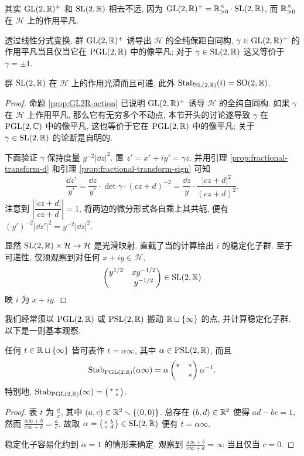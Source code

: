 其实 $\operatorname{GL}(2,\mathbb{R})^+$ 和 $\operatorname{SL}(2,\mathbb{R})$ 相去不远, 因为 $\operatorname{GL}(2,\mathbb{R})^+ = \mathbb{R}_{>0}^\times \cdot \operatorname{SL}(2,\mathbb{R})$, 而 $\mathbb{R}_{>0}^\times$ 在 $\mathcal{H}$ 上的作用平凡.

\begin{proposition}\label{prop:SL2-isometry}
	透过线性分式变换, 群 $\operatorname{GL}(2,\mathbb{R})^+$ 诱导出 $\mathcal{H}$ 的全纯保距自同构, $\gamma \in \operatorname{GL}(2,\mathbb{R})^+$ 的作用平凡当且仅当它在 $\operatorname{PGL}(2,\mathbb{R})$ 中的像平凡; 对于 $\gamma \in \operatorname{SL}(2,\mathbb{R})$ 这又等价于 $\gamma = \pm 1$.
	
	群 $\operatorname{SL}(2,\mathbb{R})$ 在 $\mathcal{H}$ 上的作用光滑而且可递, 此外 $\operatorname{Stab}_{\operatorname{SL}(2,\mathbb{R})}(i) = \operatorname{SO}(2,\mathbb{R})$.
\end{proposition}
\begin{proof}
	命题 \ref{prop:GL2R-action} 已说明 $\operatorname{GL}(2,\mathbb{R})^+$ 诱导 $\mathcal{H}$ 的全纯自同构. 如果 $\gamma$ 在 $\mathcal{H}$ 上作用平凡, 那么它有无穷多个不动点, 本节开头的讨论遂导致 $\gamma$ 在 $\operatorname{PGL}(2,\mathbb{C})$ 中的像平凡, 这也等价于它在 $\operatorname{PGL}(2,\mathbb{R})$ 中的像平凡; 关于 $\gamma \in \operatorname{SL}(2,\mathbb{R})$ 的论断是自明的.

	下面验证 $\gamma$ 保持度量 $y^{-2} |\dd z|^2$. 置 $z' = x'+iy' = \gamma z$. 并用引理 \ref{prop:fractional-transform-d} 和引理 \ref{prop:fractional-transform-sign} 可知
	\[ \frac{\dd z'}{y'} = \frac{\dd z}{y'} \cdot \det\gamma \cdot (cz+d)^{-2} = \frac{\dd z}{y} \cdot \frac{|cz+d|^2}{(cz+d)^2}. \]
	注意到 $\left|\dfrac{|cz+d|}{cz+d}\right|=1$, 将两边的微分形式各自乘上其共轭, 便有 $(y')^{-2}|\dd z'|^2 = y^{-2} |\dd z|^2$.
	
	显然 $\operatorname{SL}(2,\mathbb{R}) \times \mathcal{H} \to \mathcal{H}$ 是光滑映射. 直截了当的计算给出 $i$ 的稳定化子群. 至于可递性, 仅须观察到对任何 $x + iy \in \mathcal{H}$,
	\[ \begin{pmatrix} y^{1/2} & xy^{-1/2} \\ & y^{-1/2} \end{pmatrix} \in \operatorname{SL}(2,\mathbb{R}) \]
	映 $i$ 为 $x+iy$.
\end{proof}

我们经常须以 $\operatorname{PGL}(2,\mathbb{R})$ 或 $\operatorname{PSL}(2,\mathbb{R})$ 搬动 $\mathbb{R} \sqcup \{\infty\}$ 的点, 并计算稳定化子群. 以下是一则基本观察.
\begin{lemma}\label{prop:stab-cusp}
	任何 $t \in \mathbb{R} \sqcup \{\infty\}$ 皆可表作 $t = \alpha\infty$, 其中 $\alpha \in \operatorname{PSL}(2,\mathbb{R})$, 而且
	\[ \operatorname{Stab}_{\operatorname{PGL}(2,\mathbb{R})}(\alpha\infty) = \alpha \begin{pmatrix} * & * \\ & * \end{pmatrix} \alpha^{-1}. \]
	特别地, $\operatorname{Stab}_{\operatorname{PGL}(2,\mathbb{R})}(\infty) = \bigl(\begin{smallmatrix} * & * \\  & * \end{smallmatrix}\bigr)$.
\end{lemma}
\begin{proof}
	表 $t$ 为 $\frac{a}{c}$, 其中 $(a,c) \in \mathbb{R}^2 \smallsetminus \{(0,0)\}$. 总存在 $(b,d) \in \mathbb{R}^2$ 使得 $ad-bc=1$, 然而 $\frac{a\infty + b}{c\infty + d} = \frac{a}{c}$. 故取 $\alpha = \bigl(\begin{smallmatrix} a & b \\ c & d \end{smallmatrix}\bigr) \in \operatorname{SL}(2,\mathbb{R})$ 便有 $t = \alpha\infty$.

	稳定化子容易化约到 $\alpha = 1$ 的情形来确定. 观察到 $\frac{a\infty+b}{c\infty+d} = \infty$ 当且仅当 $c=0$.
\end{proof}


